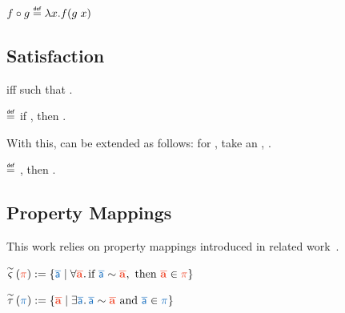 \documentclass[a4paper,12pt]{article}
\begin{document}
\begin{definition}{}
  $\fncompo{f}{g}\isdef \lambda x.f(g\;x)$
\end{definition}

\subsection{Satisfaction}
 iff  such that .

\begin{definition}{}
    \bul{$\sat{\varWholeProg}{\varProperty}$}
    $\isdef$
    if \iul{$\forall\varRuntimeTerm\ \varTrace, %
      \progstepto{\varWholeProg}{\varRuntimeTerm}{\varTrace}$
    },
    then \oul{$\varTrace\in\varProperty$}.
\end{definition}

With this,  can be extended as follows: for , take an , .

\begin{definition}{}
  \bul{$\rsat{\varComponent}{\varProperty}$} %
  $\isdef$ %
  , %
    then \oul{$\sat{\varWholeProg}{\varProperty}$%
  }.
\end{definition}


\subsection{Property Mappings}

This work relies on property mappings introduced in related work~\cite{abate2021extacc}.

\begin{definition}{}
  $ 
    \mapUniversal{\sim}{\trgProperty} := 
      \lrbraces{\srcTrace \mid %
        \forall \trgTrace\ldotp \text{if }\xrelTraces{\srcTrace}{\trgTrace}, \text{ then }%
        \trgTrace\in\trgProperty
      }
  $
\end{definition}
\begin{definition}{}
  $ 
    \mapExistential{\sim}{\srcProperty} := 
      \lrbraces{\trgTrace \mid %
        \exists \srcTrace\ldotp \xrelTraces{\srcTrace}{\trgTrace} \text{ and }%
        \srcTrace\in\srcProperty
      }
  $
\end{definition}
\end{document}

